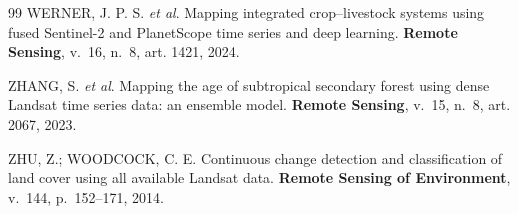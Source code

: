 \documentclass[conference]{IEEEtran}
\begin{document}
\begin{thebibliography}{99}
 WERNER, J. P. S. \textit{et al}. Mapping integrated crop--livestock systems using fused Sentinel-2 and PlanetScope time series and deep learning. \textbf{Remote Sensing}, v.~16, n.~8, art. 1421, 2024.

 ZHANG, S. \textit{et al}. Mapping the age of subtropical secondary forest using dense Landsat time series data: an ensemble model. \textbf{Remote Sensing}, v.~15, n.~8, art. 2067, 2023.

 ZHU, Z.; WOODCOCK, C. E. Continuous change detection and classification of land cover using all available Landsat data. \textbf{Remote Sensing of Environment}, v.~144, p.~152--171, 2014.

\end{thebibliography}
\end{document}
